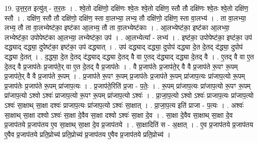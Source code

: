 \documentclass[17pt]{extarticle}
\begin{document}
19. उ॒त्त॒र॒त इत्यु॑त् - त॒र॒तः । . श्वे॒तो दक्षि॑णो॒ दक्षि॑णः श्वे॒तः श्वे॒तो दक्षि॑ण॒ स्तौ तौ दक्षि॑णः श्वे॒तः श्वे॒तो दक्षि॑ण॒ स्तौ । . दक्षि॑ण॒ स्तौ तौ दक्षि॑णो॒ दक्षि॑ण॒ स्ता वा॒लभ्या॒ लभ्य॒ तौ दक्षि॑णो॒ दक्षि॑ण॒ स्ता वा॒लभ्य॑ । . ता वा॒लभ्या॒ लभ्य॒ तौ ता वा॒लभ्येष्ट॑का॒ इष्ट॑का आ॒लभ्य॒ तौ ता वा॒लभ्येष्ट॑काः । . आ॒लभ्येष्ट॑का॒ इष्ट॑का आ॒लभ्या॒ लभ्येष्ट॑का॒ उपोपेष्ट॑का आ॒लभ्या॒ लभ्येष्ट॑का॒ उप॑ । . आ॒लभ्येत्या᳚ - लभ्य॑ । . इष्ट॑का॒ उपोपेष्ट॑का॒ इष्ट॑का॒ उप॑ दद्ध्याद् दद्ध्या॒ दुपेष्ट॑का॒ इष्ट॑का॒ उप॑ दद्ध्यात् । . उप॑ दद्ध्याद् दद्ध्या॒ दुपोप॑ दद्ध्या दे॒त दे॒तद् द॑द्ध्या॒ दुपोप॑ दद्ध्या दे॒तत् । . द॒द्ध्या॒ दे॒त दे॒तद् द॑द्ध्याद् दद्ध्या दे॒तद् वै वा ए॒तद् द॑द्ध्याद् दद्ध्या दे॒तद् वै । . ए॒तद् वै वा ए॒त दे॒तद् वै प्र॒जाप॑तेः प्र॒जाप॑ते॒र् वा ए॒त दे॒तद् वै प्र॒जाप॑तेः । . वै प्र॒जाप॑तेः प्र॒जाप॑ते॒र् वै वै प्र॒जाप॑ते रू॒पꣳ रू॒पम् प्र॒जाप॑ते॒र् वै वै प्र॒जाप॑ते रू॒पम् । . प्र॒जाप॑ते रू॒पꣳ रू॒पम् प्र॒जाप॑तेः प्र॒जाप॑ते रू॒पम् प्रा॑जाप॒त्यः प्रा॑जाप॒त्यो रू॒पम् प्र॒जाप॑तेः प्र॒जाप॑ते रू॒पम् प्रा॑जाप॒त्यः । . प्र॒जाप॑ते॒रिति॑ प्र॒जा - प॒तेः॒ । . रू॒पम् प्रा॑जाप॒त्यः प्रा॑जाप॒त्यो रू॒पꣳ रू॒पम् प्रा॑जाप॒त्यो ऽश्वो ऽश्वः॑ प्राजाप॒त्यो रू॒पꣳ रू॒पम् प्रा॑जाप॒त्यो ऽश्वः॑ । . प्रा॒जा॒प॒त्यो ऽश्वो ऽश्वः॑ प्राजाप॒त्यः प्रा॑जाप॒त्यो ऽश्वः॑ सा॒क्षाथ् सा॒क्षा दश्वः॑ प्राजाप॒त्यः प्रा॑जाप॒त्यो ऽश्वः॑ सा॒क्षात् । . प्रा॒जा॒प॒त्य इति॑ प्राजा - प॒त्यः । . अश्वः॑ सा॒क्षाथ् सा॒क्षा दश्वो ऽश्वः॑ सा॒क्षा दे॒वैव सा॒क्षा दश्वो ऽश्वः॑ सा॒क्षा दे॒व । . सा॒क्षा दे॒वैव सा॒क्षाथ् सा॒क्षा दे॒व प्र॒जाप॑तये प्र॒जाप॑तय ए॒व सा॒क्षाथ् सा॒क्षा दे॒व प्र॒जाप॑तये । . सा॒क्षादिति॑ स - अ॒क्षात् । . ए॒व प्र॒जाप॑तये प्र॒जाप॑तय ए॒वैव प्र॒जाप॑तये प्रति॒प्रोच्य॑ प्रति॒प्रोच्य॑ प्र॒जाप॑तय ए॒वैव प्र॒जाप॑तये प्रति॒प्रोच्य॑ । \newline
\end{document}
